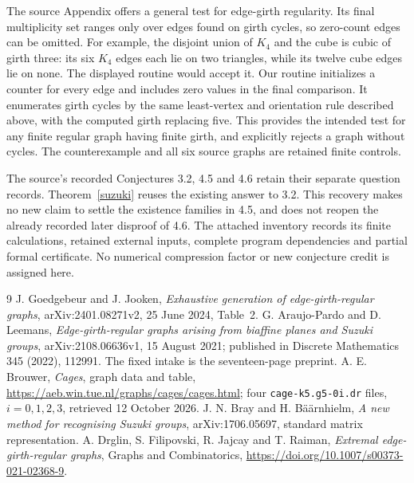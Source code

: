 \documentclass[11pt,a4paper]{article}
\begin{document}
The source Appendix offers a general test for edge-girth regularity.
Its final multiplicity set ranges only over edges found on girth cycles,
so zero-count edges can be omitted. For example, the disjoint union of
$K_4$ and the cube is cubic of girth three: its six $K_4$ edges each
lie on two triangles, while its twelve cube edges lie on none. The
displayed routine would accept it. Our routine initializes a counter
for every edge and includes zero values in the final comparison.
It enumerates girth cycles by the same least-vertex and orientation
rule described above, with the computed girth replacing five.
This provides the intended test for any finite regular graph having
finite girth, and explicitly rejects a graph without cycles. The
counterexample and all six source graphs are retained finite controls.

The source's recorded Conjectures 3.2, 4.5 and 4.6 retain their
separate question records. Theorem~\ref{suzuki} reuses the existing
answer to 3.2. This recovery makes no new claim to settle the
existence families in 4.5, and does not reopen the already recorded
later disproof of 4.6. The attached inventory records its finite calculations, retained external
inputs, complete program dependencies and partial formal certificate.
No numerical compression factor or new conjecture credit is assigned here.

\begin{thebibliography}{9}
 J. Goedgebeur and J. Jooken, \emph{Exhaustive generation
of edge-girth-regular graphs}, arXiv:2401.08271v2, 25 June 2024, Table~2.
 G. Araujo-Pardo and D. Leemans,
\emph{Edge-girth-regular graphs arising from biaffine planes and Suzuki
groups}, arXiv:2108.06636v1, 15 August 2021; published in
Discrete Mathematics 345 (2022), 112991. The fixed intake is the
seventeen-page preprint.
 A. E. Brouwer, \emph{Cages}, graph data and table,
\url{https://aeb.win.tue.nl/graphs/cages/cages.html}; four
\texttt{cage-k5.g5-0i.dr} files, $i=0,1,2,3$, retrieved 12 October 2026.
 J. N. Bray and H. B\"a\"arnhielm,
\emph{A new method for recognising Suzuki groups},
arXiv:1706.05697, standard matrix representation.
 A. Drglin, S. Filipovski, R. Jajcay and T. Raiman,
\emph{Extremal edge-girth-regular graphs}, Graphs and Combinatorics,
\url{https://doi.org/10.1007/s00373-021-02368-9}.
\end{thebibliography}
\end{document}
